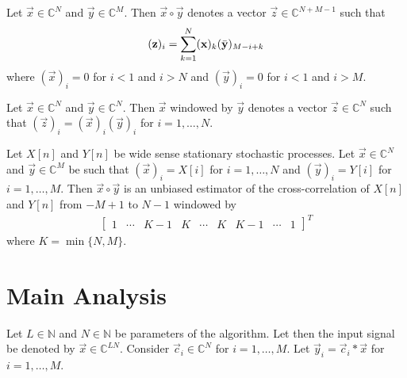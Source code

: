 \documentclass[a4paper, openany, oneside]{memoir}
\begin{document}
\begin{blockDefinition}
    Let $\vec{x} \in \mathbb{C}^N$ and $\vec{y} \in \mathbb{C}^M$. Then $\vec{x} \circ \vec{y}$ denotes a vector $\vec{z} \in \mathbb{C}^{N+M-1}$ such that
    \begin{align*}
        (\boldsymbol{\mathbf{z}})_i = \sum_{k=1}^{N} (\boldsymbol{\mathbf{x}})_k (\bar{\boldsymbol{\mathbf{y}}})_{M-i+k}
    \end{align*}
    where $(\vec{x})_i=0$ for $i < 1$ and $i > N$ and $(\vec{y})_i=0$ for $i < 1$ and $i > M$.
\end{blockDefinition}

\begin{blockDefinition}[Window]
    Let $\vec{x} \in \mathbb{C}^N$ and $\vec{y} \in \mathbb{C}^N$. Then $\vec{x}$ windowed by $\vec{y}$ denotes a vector $\vec{z} \in \mathbb{C}^N$ such that $(\vec{z})_i = (\vec{x})_i (\vec{y})_i$ for $i = 1,\ldots,N$.
\end{blockDefinition}

\begin{blockTheorem} \label{th:corr-unbiased}
    Let $X[n]$ and $Y[n]$ be wide sense stationary stochastic processes. Let $\vec{x} \in \mathbb{C}^N$ and $\vec{y} \in \mathbb{C}^M$ be such that $(\vec{x})_i = X[i]$ for $i=1,\ldots,N$ and $(\vec{y})_i = Y[i]$ for $i=1,\ldots,M$. Then $\vec{x} \circ \vec{y}$ is an unbiased estimator of the cross-correlation of $X[n]$ and $Y[n]$ from $-M+1$ to $N-1$ windowed by
    \begin{align*}
        \begin{bmatrix}
            1 & \cdots & K - 1 & K & \cdots &K & K - 1 & \cdots & 1
        \end{bmatrix}^T
    \end{align*}
    where $K = \min\{N,M\}$.
\end{blockTheorem}

\section{Main Analysis}

Let $L \in \mathbb{N}$ and $N \in \mathbb{N}$ be parameters of the algorithm. Let then the input signal be denoted by $\vec{x} \in \mathbb{C}^{LN}$. Consider $\vec{c}_i \in \mathbb{C}^{N}$ for $i = 1,\ldots,M$. Let $\vec{y}_i = \vec{c}_i \ast \vec{x}$ for $i = 1,\ldots,M$.

\begin{blockTheorem} \label{th:conv-corr}
\end{blockTheorem}
\end{document}
